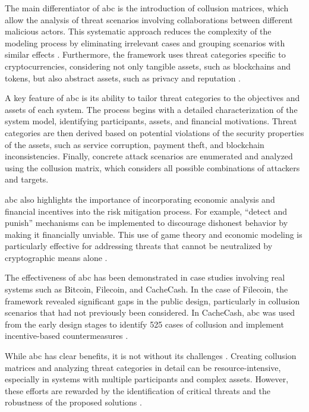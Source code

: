 The main differentiator of \gls{abc} is the introduction of collusion matrices,
which allow the analysis of threat scenarios involving collaborations between
different malicious actors. This systematic approach reduces the complexity of
the modeling process by eliminating irrelevant cases and grouping scenarios with
similar effects \cite{AbcCrypto}. Furthermore, the framework uses threat
categories specific to cryptocurrencies, considering not only tangible assets,
such as blockchains and tokens, but also abstract assets, such as privacy and
reputation \cite{AbcCrypto}.

A key feature of \gls{abc} is its ability to tailor threat categories to the
objectives and assets of each \cite{AbcCrypto} system. The process begins with a
detailed characterization of the system model, identifying participants, assets,
and financial motivations. Threat categories are then derived based on potential
violations of the security properties of the assets, such as service corruption,
payment theft, and blockchain inconsistencies. Finally, concrete attack
scenarios are enumerated and analyzed using the collusion matrix, which
considers all possible combinations of attackers and \cite{AbcCrypto} targets.

\gls{abc} also highlights the importance of incorporating economic analysis and
financial incentives into the risk mitigation process. For example, “detect and
punish” mechanisms can be implemented to discourage dishonest behavior by making
it financially unviable. This use of game theory and economic modeling is
particularly effective for addressing threats that cannot be neutralized by
cryptographic means alone \cite{AbcCrypto}.

The effectiveness of \gls{abc} has been demonstrated in case studies involving
real systems such as Bitcoin, Filecoin, and CacheCash. In the case of Filecoin,
the framework revealed significant gaps in the public design, particularly in
collusion scenarios that had not previously been considered. In CacheCash,
\gls{abc} was used from the early design stages to identify 525 cases of
collusion and implement incentive-based countermeasures \cite{AbcCrypto}.

While \gls{abc} has clear benefits, it is not without its challenges
\cite{AbcCrypto}. Creating collusion matrices and analyzing threat categories in
detail can be resource-intensive, especially in systems with multiple
participants and complex assets. However, these efforts are rewarded by the
identification of critical threats and the robustness of the proposed solutions
\cite{AbcCrypto}.

